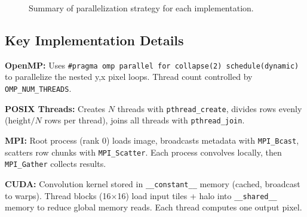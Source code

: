 \documentclass[12pt, a4paper]{article}
\begin{document}
\begin{figure}[H]
\centering
{}
\caption{Summary of parallelization strategy for each implementation.}
\end{figure}

\subsection{Key Implementation Details}

\textbf{OpenMP:} Uses \texttt{\#pragma omp parallel for collapse(2) schedule(dynamic)} to parallelize the nested y,x pixel loops. Thread count controlled by \texttt{OMP\_NUM\_THREADS}.

\textbf{POSIX Threads:} Creates $N$ threads with \texttt{pthread\_create}, divides rows evenly ($\text{height}/N$ rows per thread), joins all threads with \texttt{pthread\_join}.

\textbf{MPI:} Root process (rank 0) loads image, broadcasts metadata with \texttt{MPI\_Bcast}, scatters row chunks with \texttt{MPI\_Scatter}. Each process convolves locally, then \texttt{MPI\_Gather} collects results.

\textbf{CUDA:} Convolution kernel stored in \texttt{\_\_constant\_\_} memory (cached, broadcast to warps). Thread blocks (16$\times$16) load input tiles + halo into \texttt{\_\_shared\_\_} memory to reduce global memory reads. Each thread computes one output pixel.
\end{document}
